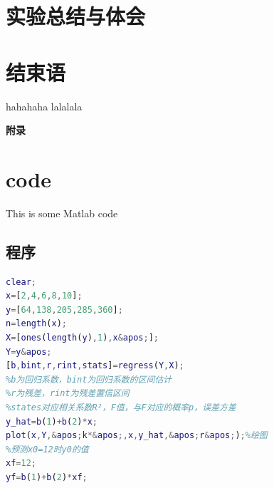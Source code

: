 \documentclass[UTF8,12pt,a4paper]{article}
\begin{document}
\section{实验总结与体会}
\section{结束语}

\begin{thebibliography}{2}
	 hahahaha
	 lalalala
\end{thebibliography}
%
%



\appendix
\addappheadtotoc%

\newpage

\begin{center}
	\Huge\bfseries\heiti 附录 %
\end{center}

\section{code}

This is some Matlab code
\subsection{程序}
\begin{lstlisting}[language={Matlab},morekeywords={regress}]
clear;
x=[2,4,6,8,10];
y=[64,138,205,285,360];
n=length(x);
X=[ones(length(y),1),x&apos;];
Y=y&apos;
[b,bint,r,rint,stats]=regress(Y,X);
%b为回归系数，bint为回归系数的区间估计
%r为残差，rint为残差置信区间
%states对应相关系数R²，F值，与F对应的概率p，误差方差
y_hat=b(1)+b(2)*x;
plot(x,Y,&apos;k*&apos;,x,y_hat,&apos;r&apos;);%绘图
%预测x0=12时y0的值
xf=12;
yf=b(1)+b(2)*xf;
\end{lstlisting}


%
\end{document}
